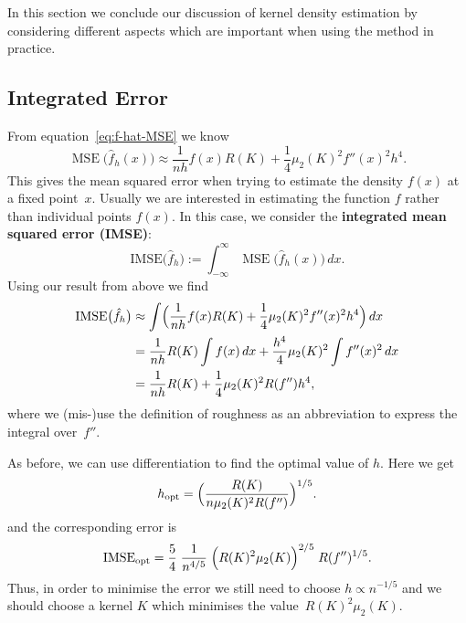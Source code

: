 \documentclass[
  a4paper,
]{article}
\theoremstyle{definition}
\theoremstyle{definition}
\theoremstyle{definition}
\theoremstyle{definition}
\theoremstyle{remark}
\begin{document}
In this section we conclude our discussion of kernel density estimation
by considering different aspects which are important when using the method
in practice.

\hypertarget{integrated-error}{%
\subsection{Integrated Error}\label{integrated-error}}

From equation~\eqref{eq:f-hat-MSE} we know
\begin{equation*}
  \mathop{\mathrm{MSE}}\nolimits\bigl( \hat f_h(x) \bigr)
  \approx \frac{1}{nh} f(x) R(K) + \frac14 \mu_2(K)^2 f''(x)^2 h^4.
\end{equation*}
This gives the mean squared error when trying to estimate the density
\(f(x)\) at a fixed point~\(x\). Usually we are interested in estimating
the function \(f\) rather than individual points \(f(x)\). In this case,
we consider the \textbf{integrated mean squared error (IMSE)}:
\begin{equation*}
  \mathrm{IMSE}\bigl( \hat f_h \bigr)
  := \int_{-\infty}^\infty \mathop{\mathrm{MSE}}\nolimits\bigl( \hat f_h(x) \bigr) \,dx.
\end{equation*}
Using our result from above we find
\begin{align*}
  \mathrm{IMSE}\bigl( \hat f_h \bigr)
  &\approx \int \Bigl( \frac{1}{nh} f(x) R(K) + \frac14 \mu_2(K)^2 f''(x)^2 h^4 \Bigr) \,dx \\
  &= \frac{1}{nh} R(K) \int f(x) \,dx + \frac{h^4}{4} \mu_2(K)^2 \int f''(x)^2 \,dx \\
  &= \frac{1}{nh} R(K) + \frac{1}{4} \mu_2(K)^2 R(f'') h^4,
\end{align*}
where we (mis-)use the definition of roughness as an abbreviation to express
the integral over~\(f''\).

As before, we can use differentiation to find the optimal value of \(h\).
Here we get
\begin{equation*}
  h_\mathrm{opt}
  = \Bigl( \frac{R(K)}{n \mu_2(K)^2 R(f'')} \Bigr)^{1/5}.
\end{equation*}
and the corresponding error is
\begin{equation}
  \mathrm{IMSE}_\mathrm{opt}
  = \frac54 \; \frac{1}{n^{4/5}}
      \; \Bigl( R(K)^2 \mu_2(K) \Bigr)^{2/5}
      \; R(f'')^{1/5}.  \label{eq:IMSE-opt}
\end{equation}
Thus, in order to minimise the error we still need to choose
\(h \propto n^{-1/5}\) and we should choose a kernel \(K\) which minimises
the value~\(R(K)^2 \mu_2(K)\).
\end{document}
